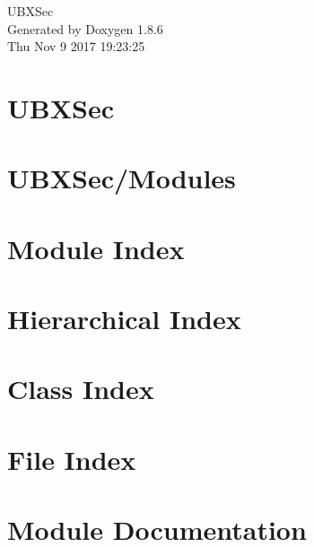 \documentclass[twoside]{book}
\newcommand{\clearemptydoublepage}{%
  \newpage{\pagestyle{empty}\cleardoublepage}%
}
\begin{document}
\hypersetup{pageanchor=false}
\begin{titlepage}
\vspace*{7cm}
\begin{center}%
{\Large U\-B\-X\-Sec }\\
\vspace*{1cm}
{\large Generated by Doxygen 1.8.6}\\
\vspace*{0.5cm}
{\small Thu Nov 9 2017 19:23:25}\\
\end{center}
\end{titlepage}
\clearemptydoublepage
\tableofcontents
\clearemptydoublepage
{}
\hypersetup{pageanchor=true}

\chapter{U\-B\-X\-Sec}
\label{md__home_travis_build_marcodeltutto_UBXSec_README}
\hypertarget{md__home_travis_build_marcodeltutto_UBXSec_README}{}

\chapter{U\-B\-X\-Sec/\-Modules}
\label{md__home_travis_build_marcodeltutto_UBXSec_Modules_README}
\hypertarget{md__home_travis_build_marcodeltutto_UBXSec_Modules_README}{}

\chapter{Module Index}

\chapter{Hierarchical Index}

\chapter{Class Index}

\chapter{File Index}

\chapter{Module Documentation}


\end{document}
